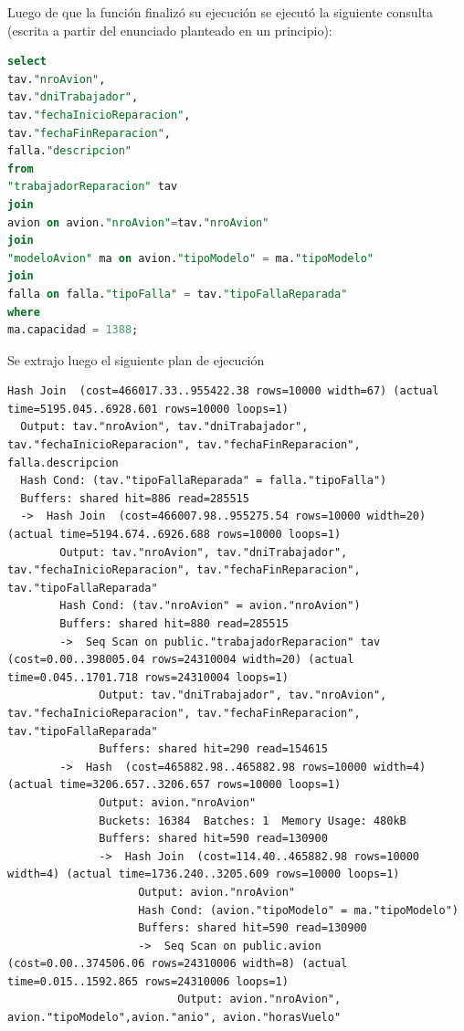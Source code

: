 \documentclass[12pt]{report}
\begin{document}
Luego de que la función finalizó su ejecución se ejecutó la siguiente consulta (escrita a partir del enunciado planteado en un principio):

\begin{lstlisting}[language=SQL]
select
tav."nroAvion",
tav."dniTrabajador",
tav."fechaInicioReparacion",
tav."fechaFinReparacion",
falla."descripcion"
from 
"trabajadorReparacion" tav
join 
avion on avion."nroAvion"=tav."nroAvion"
join
"modeloAvion" ma on avion."tipoModelo" = ma."tipoModelo"
join
falla on falla."tipoFalla" = tav."tipoFallaReparada"
where
ma.capacidad = 1388;
\end{lstlisting}

Se extrajo luego el siguiente plan de ejecución

\begin{lstlisting}
Hash Join  (cost=466017.33..955422.38 rows=10000 width=67) (actual time=5195.045..6928.601 rows=10000 loops=1)
  Output: tav."nroAvion", tav."dniTrabajador", tav."fechaInicioReparacion", tav."fechaFinReparacion", falla.descripcion
  Hash Cond: (tav."tipoFallaReparada" = falla."tipoFalla")
  Buffers: shared hit=886 read=285515
  ->  Hash Join  (cost=466007.98..955275.54 rows=10000 width=20) (actual time=5194.674..6926.688 rows=10000 loops=1)
        Output: tav."nroAvion", tav."dniTrabajador", tav."fechaInicioReparacion", tav."fechaFinReparacion", tav."tipoFallaReparada"
        Hash Cond: (tav."nroAvion" = avion."nroAvion")
        Buffers: shared hit=880 read=285515
        ->  Seq Scan on public."trabajadorReparacion" tav  (cost=0.00..398005.04 rows=24310004 width=20) (actual time=0.045..1701.718 rows=24310004 loops=1)
              Output: tav."dniTrabajador", tav."nroAvion", tav."fechaInicioReparacion", tav."fechaFinReparacion", tav."tipoFallaReparada"
              Buffers: shared hit=290 read=154615
        ->  Hash  (cost=465882.98..465882.98 rows=10000 width=4) (actual time=3206.657..3206.657 rows=10000 loops=1)
              Output: avion."nroAvion"
              Buckets: 16384  Batches: 1  Memory Usage: 480kB
              Buffers: shared hit=590 read=130900
              ->  Hash Join  (cost=114.40..465882.98 rows=10000 width=4) (actual time=1736.240..3205.609 rows=10000 loops=1)
                    Output: avion."nroAvion"
                    Hash Cond: (avion."tipoModelo" = ma."tipoModelo")
                    Buffers: shared hit=590 read=130900
                    ->  Seq Scan on public.avion  (cost=0.00..374506.06 rows=24310006 width=8) (actual time=0.015..1592.865 rows=24310006 loops=1)
                          Output: avion."nroAvion", avion."tipoModelo",avion."anio", avion."horasVuelo"

\end{lstlisting}
\end{document}
